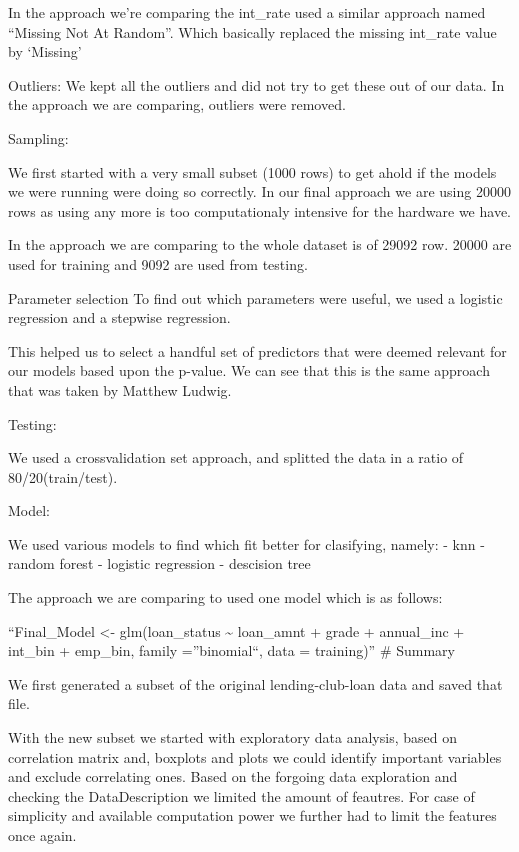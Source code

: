 \documentclass[]{article}
\begin{document}
In the approach we're comparing the int\_rate used a similar approach
named ``Missing Not At Random''. Which basically replaced the missing
int\_rate value by `Missing'

Outliers: We kept all the outliers and did not try to get these out of
our data. In the approach we are comparing, outliers were removed.

Sampling:

We first started with a very small subset (1000 rows) to get ahold if
the models we were running were doing so correctly. In our final
approach we are using 20000 rows as using any more is too computationaly
intensive for the hardware we have.

In the approach we are comparing to the whole dataset is of 29092 row.
20000 are used for training and 9092 are used from testing.

Parameter selection To find out which parameters were useful, we used a
logistic regression and a stepwise regression.

This helped us to select a handful set of predictors that were deemed
relevant for our models based upon the p-value. We can see that this is
the same approach that was taken by Matthew Ludwig.

Testing:

We used a crossvalidation set approach, and splitted the data in a ratio
of 80/20(train/test).

Model:

We used various models to find which fit better for clasifying, namely:
- knn - random forest - logistic regression - descision tree

The approach we are comparing to used one model which is as follows:

``Final\_Model \textless{}- glm(loan\_status \textasciitilde{}
loan\_amnt + grade + annual\_inc + int\_bin + emp\_bin, family
=''binomial``, data = training)'' \# Summary

We first generated a subset of the original lending-club-loan data and
saved that file.

With the new subset we started with exploratory data analysis, based on
correlation matrix and, boxplots and plots we could identify important
variables and exclude correlating ones. Based on the forgoing data
exploration and checking the DataDescription we limited the amount of
feautres. For case of simplicity and available computation power we
further had to limit the features once again.
\end{document}
